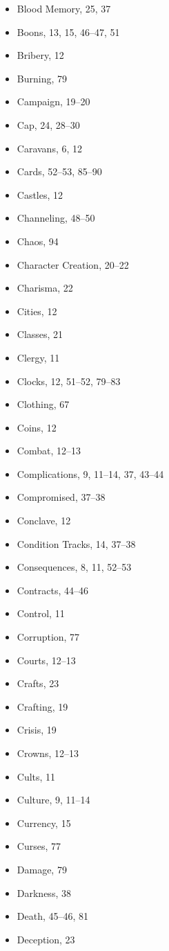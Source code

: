 \begin{multicols}{2}
\begin{itemize}
  \item Blood Memory, 25, 37
  \item Boons, 13, 15, 46--47, 51
  \item Bribery, 12
  \item Burning, 79
  \item Campaign, 19--20
  \item Cap, 24, 28--30
  \item Caravans, 6, 12
  \item Cards, 52--53, 85--90
  \item Castles, 12
  \item Channeling, 48--50
  \item Chaos, 94
  \item Character Creation, 20--22
  \item Charisma, 22
  \item Cities, 12
  \item Classes, 21
  \item Clergy, 11
  \item Clocks, 12, 51--52, 79--83
  \item Clothing, 67
  \item Coins, 12
  \item Combat, 12--13
  \item Complications, 9, 11--14, 37, 43--44
  \item Compromised, 37--38
  \item Conclave, 12
  \item Condition Tracks, 14, 37--38
  \item Consequences, 8, 11, 52--53
  \item Contracts, 44--46
  \item Control, 11
  \item Corruption, 77
  \item Courts, 12--13
  \item Crafts, 23
  \item Crafting, 19
  \item Crisis, 19
  \item Crowns, 12--13
  \item Cults, 11
  \item Culture, 9, 11--14
  \item Currency, 15
  \item Curses, 77
  \item Damage, 79
  \item Darkness, 38
  \item Death, 45--46, 81
  \item Deception, 23

\end{itemize}
\end{multicols}
